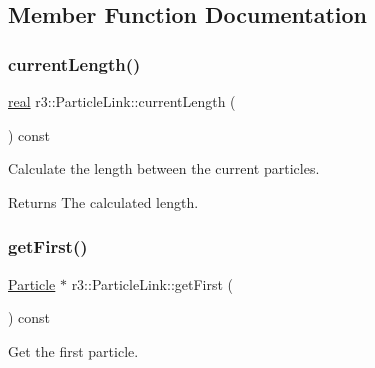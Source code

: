 \subsection{Member Function Documentation}
\mbox{\label{classr3_1_1_particle_link_a5ad76e8eb6f9b78e3589c74e5d5013fc}} 
\subsubsection{\texorpdfstring{current\+Length()}{currentLength()}}
{\footnotesize\ttfamily \mbox{\hyperlink{namespacer3_ab2016b3e3f743fb735afce242f0dc1eb}{real}} r3\+::\+Particle\+Link\+::current\+Length (\begin{DoxyParamCaption}{ }\end{DoxyParamCaption}) const\hspace{0.3cm}{\ttfamily [protected]}}



Calculate the length between the current particles. 

\begin{DoxyReturn}{Returns}
The calculated length. 
\end{DoxyReturn}
\mbox{\label{classr3_1_1_particle_link_a432355211b3aa1353a33aaf9f003825e}} 
\subsubsection{\texorpdfstring{get\+First()}{getFirst()}}
{\footnotesize\ttfamily \mbox{\hyperlink{classr3_1_1_particle}{Particle}} $\ast$ r3\+::\+Particle\+Link\+::get\+First (\begin{DoxyParamCaption}{ }\end{DoxyParamCaption}) const}



Get the first particle. 

\mbox{\label{classr3_1_1_particle_link_a90a94eda0137a354739dc00923ee7f03}} 
